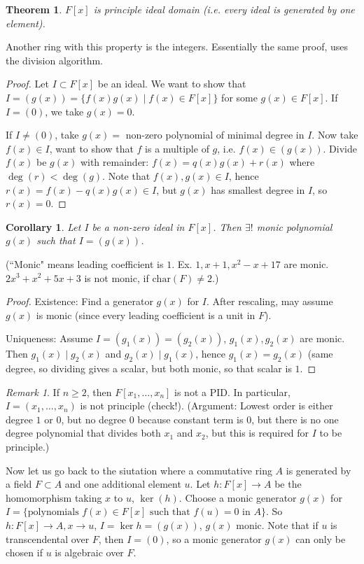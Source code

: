 \documentclass{article}
\theoremstyle{plain}
\newtheorem{theorem}{Theorem}
\newtheorem{corollary}{Corollary}
\theoremstyle{remark}
\newtheorem{remark}{Remark}
\begin{document}
\begin{theorem}
	$F[x]$ is principle ideal domain (i.e. every ideal is generated by one element).
\end{theorem}
Another ring with this property is the integers.
Essentially the same proof, uses the division algorithm.
\begin{proof}
	Let $I \subset F[x]$ be an ideal.
	We want to show that $I = (g(x)) = \{f(x)g(x) \mid f(x) \in F[x]\}$
	for some $g(x) \in F[x]$.
	If $I = (0)$, we take $g(x) = 0$.

	If $I \neq (0)$, take $g(x) = $ non-zero polynomial of minimal degree in $I$.
	Now take $f(x) \in I$, want to show that $f$ is a multiple of $g$,
	i.e. $f(x) \in (g(x))$.
	Divide $f(x)$ be $g(x)$ with remainder:
	$f(x) = q(x)g(x) + r(x)$ where $\deg(r) < \deg(g)$.
	Note that $f(x), g(x) \in I$, hence $r(x) = f(x) - q(x)g(x) \in I$,
	but $g(x)$ has smallest degree in $I$, so $r(x) = 0$.
\end{proof}
\begin{corollary}
	Let $I$ be a non-zero ideal in $F[x]$.
	Then $\exists!$ monic polynomial $g(x)$ such that $I = (g(x))$.
\end{corollary}
(``Monic" means leading coefficient is $1$.
Ex. $1,x+1,x^2-x+17$ are monic. $2x^3 + x^2 + 5x + 3$
is not monic, if $\mathrm{char}(F) \neq 2$.)
\begin{proof}
	Existence: Find a generator $g(x)$ for $I$.
	After rescaling, may assume $g(x)$ is monic
	(since every leading coefficient is a unit in $F$).

	Uniqueness: Assume $I = (g_1(x)) = (g_2(x))$,
	$g_1(x),g_2(x)$ are monic.
	Then $g_1(x) \mid g_2(x)$ and $g_2(x) \mid g_1(x)$,
	hence $g_1(x) = g_2(x)$
	(same degree, so dividing gives a scalar,
	but both monic, so that scalar is $1$.
\end{proof}

\begin{remark}
	If $n \geq 2$, then $F[x_1,\dots,x_n]$ is not a PID.
	In particular, $I = (x_1,\dots,x_n)$ is not principle (check!).
	(Argument: Lowest order is either degree $1$ or $0$,
	but no degree $0$ because constant term is $0$,
	but there is no one degree polynomial that divides both $x_1$ and $x_2$,
	but this is required for $I$ to be principle.)
\end{remark}

Now let us go back to the siutation where a commutative ring $A$
is generated by a field $F \subset A$ and one additional element $u$.
Let $h \colon F[x] \to A$ be the homomorphism taking $x$ to $u$, $\ker(h)$.
Choose a monic generator $g(x)$ for $I =
\{\text{polynomials }f(x) \in F[x] \text{ such that }f(u) = 0 \text{ in }A\}$.
So $h \colon F[x] \to A, x \to u$, $I = \ker{h} = (g(x))$, $g(x)$ monic.
Note that if $u$ is transcendental over $F$, then $I = (0)$,
so a monic generator $g(x)$ can only be chosen if $u$ is algebraic over $F$.
\end{document}
